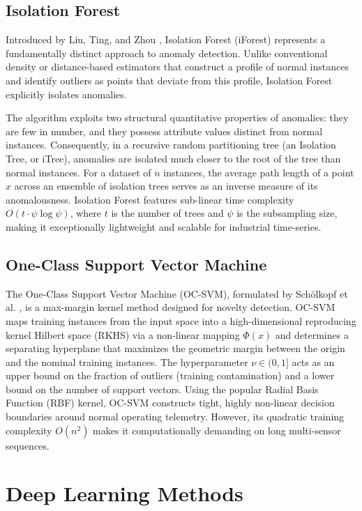 \documentclass[12pt,a4paper,oneside]{report}
\begin{document}
\subsection{Isolation Forest}
Introduced by Liu, Ting, and Zhou \cite{liu2008isolation}, Isolation Forest (iForest) represents a fundamentally distinct approach to anomaly detection. Unlike conventional density or distance-based estimators that construct a profile of normal instances and identify outliers as points that deviate from this profile, Isolation Forest explicitly isolates anomalies. 

The algorithm exploits two structural quantitative properties of anomalies: they are few in number, and they possess attribute values distinct from normal instances. Consequently, in a recursive random partitioning tree (an Isolation Tree, or iTree), anomalies are isolated much closer to the root of the tree than normal instances. For a dataset of $n$ instances, the average path length of a point $x$ across an ensemble of isolation trees serves as an inverse measure of its anomalousness. Isolation Forest features sub-linear time complexity $O(t \cdot \psi \log \psi)$, where $t$ is the number of trees and $\psi$ is the subsampling size, making it exceptionally lightweight and scalable for industrial time-series.

\subsection{One-Class Support Vector Machine}
The One-Class Support Vector Machine (OC-SVM), formulated by Sch{\"o}lkopf et al. \cite{scholkopf2001estimating}, is a max-margin kernel method designed for novelty detection. OC-SVM maps training instances from the input space into a high-dimensional reproducing kernel Hilbert space (RKHS) via a non-linear mapping $\Phi(x)$ and determines a separating hyperplane that maximizes the geometric margin between the origin and the nominal training instances. The hyperparameter $\nu \in (0, 1]$ acts as an upper bound on the fraction of outliers (training contamination) and a lower bound on the number of support vectors. Using the popular Radial Basis Function (RBF) kernel, OC-SVM constructs tight, highly non-linear decision boundaries around normal operating telemetry. However, its quadratic training complexity $O(n^2)$ makes it computationally demanding on long multi-sensor sequences.

\section{Deep Learning Methods}
\end{document}
